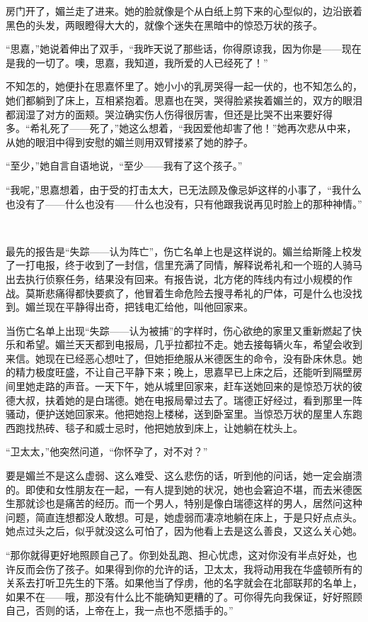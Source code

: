 \par 房门开了，媚兰走了进来。她的脸就像是个从白纸上剪下来的心型似的，边沿嵌着黑色的头发，两眼瞪得大大的，就像个迷失在黑暗中的惊恐万状的孩子。
\par “思嘉，”她说着伸出了双手，“我昨天说了那些话，你得原谅我，因为你是——现在是我的一切了。噢，思嘉，我知道，我所爱的人已经死了！”
\par 不知怎的，她便扑在思嘉怀里了。她小小的乳房哭得一起一伏的，也不知怎么的，她们都躺到了床上，互相紧抱着。思嘉也在哭，哭得脸紧挨着媚兰的，双方的眼泪都润湿了对方的面颊。哭泣确实伤人伤得很厉害，但还是比哭不出来要好得多。“希礼死了——死了，”她这么想着，“我因爱他却害了他！”她再次悲从中来，从她的眼泪中得到安慰的媚兰则用双臂搂紧了她的脖子。
\par “至少，”她自言自语地说，“至少——我有了这个孩子。”
\par “我呢，”思嘉想着，由于受的打击太大，已无法顾及像忌妒这样的小事了，“我什么也没有了——什么也没有——什么也没有，只有他跟我说再见时脸上的那种神情。”
\par  
\par 最先的报告是“失踪——认为阵亡”，伤亡名单上也是这样说的。媚兰给斯隆上校发了一打电报，终于收到了一封信，信里充满了同情，解释说希礼和一个班的人骑马出去执行侦察任务，结果没有回来。有报告说，北方佬的阵线内有过小规模的作战。莫斯悲痛得都快要疯了，他冒着生命危险去搜寻希礼的尸体，可是什么也没找到。媚兰现在平静得出奇，把钱电汇给他，叫他回家来。
\par 当伤亡名单上出现“失踪——认为被捕”的字样时，伤心欲绝的家里又重新燃起了快乐和希望。媚兰天天都到电报局，几乎拉都拉不走。她去接每辆火车，希望会收到来信。她现在已经恶心想吐了，但她拒绝服从米德医生的命令，没有卧床休息。她的精力极度旺盛，不让自己平静下来；晚上，思嘉早已上床之后，还能听到隔壁房间里她走路的声音。一天下午，她从城里回家来，赶车送她回来的是惊恐万状的彼德大叔，扶着她的是白瑞德。她在电报局晕过去了。瑞德正好经过，看到那里一阵骚动，便护送她回家来。他把她抱上楼梯，送到卧室里。当惊恐万状的屋里人东跑西跑找热砖、毯子和威士忌时，他把她放到床上，让她躺在枕头上。
\par “卫太太，”他突然问道，“你怀孕了，对不对？”
\par 要是媚兰不是这么虚弱、这么难受、这么悲伤的话，听到他的问话，她一定会崩溃的。即使和女性朋友在一起，一有人提到她的状况，她也会窘迫不堪，而去米德医生那就诊也是痛苦的经历。而一个男人，特别是像白瑞德这样的男人，居然问这种问题，简直连想都没人敢想。可是，她虚弱而凄凉地躺在床上，于是只好点点头。她点过头之后，似乎就没这么可怕了，因为他看上去是这么善良，又这么关心她。
\par “那你就得更好地照顾自己了。你到处乱跑、担心忧虑，这对你没有半点好处，也许反而会伤了孩子。如果得到你的允许的话，卫太太，我将动用我在华盛顿所有的关系去打听卫先生的下落。如果他当了俘虏，他的名字就会在北部联邦的名单上，如果不在——哦，那没有什么比不能确知更糟的了。可你得先向我保证，好好照顾自己，否则的话，上帝在上，我一点也不愿插手的。”
